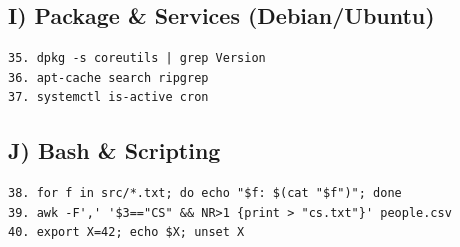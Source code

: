 \subsection*{I) Package \& Services (Debian/Ubuntu)}
\begin{verbatim}
35. dpkg -s coreutils | grep Version
36. apt-cache search ripgrep
37. systemctl is-active cron
\end{verbatim}

\subsection*{J) Bash \& Scripting}
\begin{verbatim}
38. for f in src/*.txt; do echo "$f: $(cat "$f")"; done
39. awk -F',' '$3=="CS" && NR>1 {print > "cs.txt"}' people.csv
40. export X=42; echo $X; unset X
\end{verbatim}







